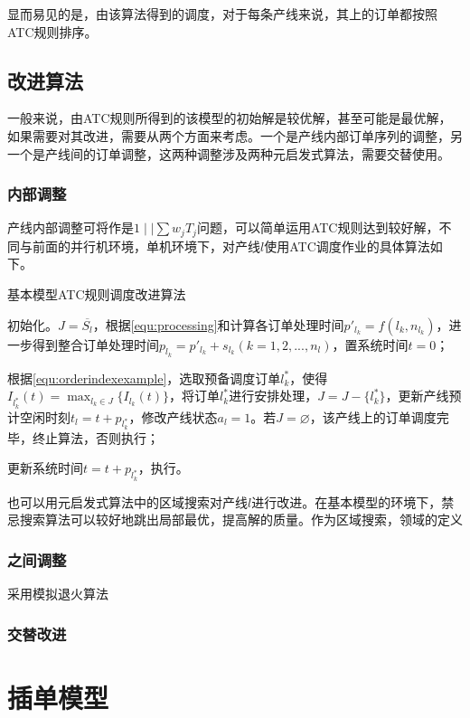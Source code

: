 显而易见的是，由该算法得到的调度，对于每条产线来说，其上的订单都按照ATC规则排序。

\subsection{改进算法}
一般来说，由ATC规则所得到的该模型的初始解是较优解，甚至可能是最优解，如果需要对其改进，需要从两个方面来考虑。一个是产线内部订单序列的调整，另一个是产线间的订单调整，这两种调整涉及两种元启发式算法，需要交替使用。
\subsubsection{内部调整}
产线内部调整可将作是$1\mid\mid \sum w_jT_j$问题，可以简单运用ATC规则达到较好解，不同与前面的并行机环境，单机环境下，对产线$l$使用ATC调度作业的具体算法如下。

\begin{algori}
基本模型ATC规则调度改进算法
\begin{asparaenum}
\renewcommand{\labelenumi}{\bf Step\theenumi~}
\item 初始化。$J = \overline{S_l}$，根据\eqref{equ:processing}和计算各订单处理时间$p'_{l_k} = f({l_k}, n_{l_k})$，进一步得到整合订单处理时间$p_{l_k} = p'_{l_k} + s_{l_k}(k = 1,2,...,n_l)$，置系统时间$t = 0$；
\item 根据\eqref{equ:orderindexexample}，选取预备调度订单$l_k^*$，使得$I_{l_k^*}(t) = \displaystyle\max_{l_k\in J}\{I_{l_k}(t)\}$，将订单$l_k^*$进行安排处理，$J = J -\{l_k^*\}$，更新产线预计空闲时刻$t_{l} = t + p_{l_k^*}$，修改产线状态$a_{l} = 1$。若$J = \varnothing$，该产线上的订单调度完毕，终止算法，否则执行；
\item 更新系统时间$t = t + p_{l_k^*}$，执行。
\end{asparaenum}
\end{algori}

也可以用元启发式算法中的区域搜索对产线$l$进行改进。在基本模型的环境下，禁忌搜索算法可以较好地跳出局部最优，提高解的质量。作为区域搜索，领域的定义
\subsubsection{之间调整}
采用模拟退火算法
\subsubsection{交替改进}
\section{插单模型}
